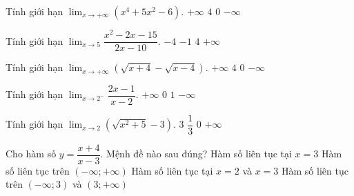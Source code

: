 \begin{ex}%
	Tính giới hạn $\displaystyle \lim_{x \to +\infty} \left (x^4+5x^2-6\right ).$
	\choice
	{\True $+\infty$}
	{$4$}
	{$0$}
	{$-\infty$}
\end{ex}

\begin{ex}%
	Tính giới hạn $\displaystyle \lim_{x \to 5} \dfrac{x^2-2x-15}{2x-10}.$
	\choice
	{$-4$}
	{$-1$}
	{\True $4$}
	{$+\infty$}
\end{ex}

\begin{ex}%
	Tính giới hạn $\displaystyle \lim_{x \to +\infty} \left (\sqrt{x+4}-\sqrt{x-4}\right ).$
	\choice
	{$+\infty$}
	{$4$}
	{\True  $0$}
	{$-\infty$}
\end{ex}

\begin{ex}%
	Tính giới hạn $\displaystyle \lim_{x \to 2^-} \dfrac{2x-1}{x-2}.$
	\choice
	{$+\infty$}
	{$0$}
	{$1$}
	{\True $-\infty$}
\end{ex}

\begin{ex}%
	Tính giới hạn $\displaystyle \lim_{x \to 2} \left  (\sqrt{x^2+5}-3\right ).$
	\choice
	{$3$}
	{$\dfrac{1}{3}$}
	{\True $0$}
	{$+\infty$}
\end{ex}

\begin{ex}%
	Cho hàm số $y=\dfrac{x+4}{x-3}$. Mệnh đề nào sau đúng?
	\choice
	{Hàm số liên tục tại $x=3$}
	{Hàm số liên tục trên $(-\infty;+\infty)$}
	{Hàm số liên tục tại $x=2$ và $x=3$}
	{\True Hàm số liên tục trên $(-\infty;3)$ và $(3;+\infty)$}
\end{ex}

